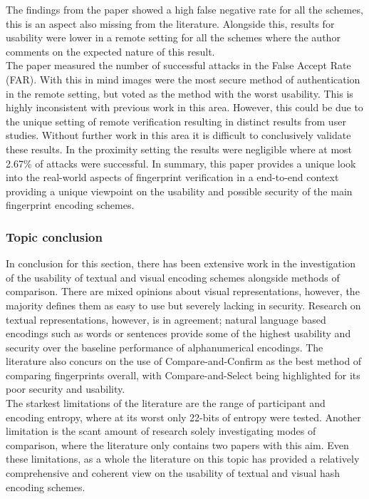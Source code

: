 The findings from the paper showed a high false negative rate for all the schemes, this is an aspect also missing from the literature. Alongside this, results for usability were lower in a remote setting for all the schemes where the author comments on the expected nature of this result.\\
The paper measured the number of successful attacks in the False Accept Rate (FAR). With this in mind images were the most secure method of authentication in the remote setting, but voted as the method with the worst usability. This is highly inconsistent with previous work in this area. However, this could be due to the unique setting of remote verification resulting in distinct results from user studies. Without further work in this area it is difficult to conclusively validate these results. In the proximity setting the results were negligible where at most 2.67\% of attacks were successful. In summary, this paper provides a unique look into the real-world aspects of fingerprint verification in a end-to-end context providing a unique viewpoint on the usability and possible security of the main fingerprint encoding schemes.

\subsubsection{Topic conclusion}

In conclusion for this section, there has been extensive work in the investigation of the usability of textual and visual encoding schemes alongside methods of comparison. There are mixed opinions about visual representations, however, the majority defines them as easy to use but severely lacking in security. Research on textual representations, however, is in agreement; natural language based encodings such as words or sentences provide some of the highest usability and security over the baseline performance of alphanumerical encodings. The literature also concurs on the use of Compare-and-Confirm as the best method of comparing fingerprints overall, with Compare-and-Select being highlighted for its poor security and usability.\\
The starkest limitations of the literature are the range of participant and encoding entropy, where at its worst only 22-bits of entropy were tested. Another limitation is the scant amount of research solely investigating modes of comparison, where the literature only contains two papers with this aim. Even these limitations, as a whole the literature on this topic has provided a relatively comprehensive and coherent view on the usability of textual and visual hash encoding schemes.

